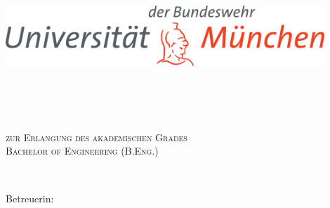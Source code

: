 \begin{titlepage}

\setlength{\topmargin}{0pt}

\begin{center}

\begin{center}
  \includegraphics[width=12cm]{images/logos/UniBwMSignet.pdf}
\end{center}

\vspace{30pt}


\huge
\textsc{\theTitle}\\
\vspace{5pt}
\large
\textsc{\theSubTitle}\\
\vspace{40pt}

\normalsize
\textsc{\theCertificate}                                %
\textsc{\\zur Erlangung des akademischen Grades\\}
\textsc{Bachelor of Engineering (B.Eng.)}\\

\vspace{40pt}


\textrm{\large \theAuthor}\\                            %

\normalsize

\vspace{40pt}

Betreuerin:\\

\vspace{0pt}

\textrm{\large \theAdviserA}\\                          %


\end{center}
\end{titlepage}
